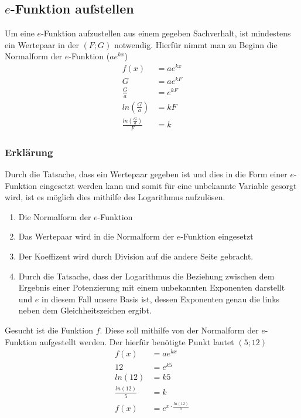 \subsection{$e$-Funktion aufstellen}
Um eine $e$-Funktion aufzustellen aus einem gegeben Sachverhalt, ist mindestens ein Wertepaar in der $(F;G)$ notwendig. Hierfür nimmt man zu Beginn die Normalform der $e$-Funktion ($ae^{kx}$)
\begin{align}
	f(x)&=ae^{kx}\\
	G&=ae^{kF}\\
	\frac{G}{a}&=e^{kF}\\
	ln\left(\frac{G}{a}\right)&=kF\\
	\frac{ln\left(\frac{G}{a}\right)}{F}&=k
\end{align}
\subsubsection{Erklärung}
Durch die Tatsache, dass ein Wertepaar gegeben ist und dies in die Form einer $e$-Funktion eingesetzt werden kann und somit für eine unbekannte Variable gesorgt wird, ist es möglich dies mithilfe des Logarithmus aufzulösen.
\begin{enumerate}
	\item Die Normalform der $e$-Funktion
	\item Das Wertepaar wird in die Normalform der $e$-Funktion eingesetzt
	\item Der Koeffizent wird durch Division auf die andere Seite gebracht. 
	\item Durch die Tatsache, dass der Logarithmus die Beziehung zwischen dem Ergebnis einer Potenzierung mit einem unbekannten Exponenten darstellt und $e$ in diesem Fall unsere Basis ist, dessen Exponenten genau die links neben dem Gleichheitszeichen ergibt. 
\end{enumerate}

\begin{beispiel}
	Gesucht ist die Funktion $f$. Diese soll mithilfe von der Normalform der $e$-Funktion aufgestellt werden. Der hierfür benötigte Punkt lautet $(5;12)$
	\begin{align*}
		f(x)&=ae^{kx}\\
		12&=e^{k5}\tag{Anwenden des ln}\\
		ln(12)&=k5\tag{Dividieren mit 5}\\
		\frac{ln(12)}{5}&=k\\
		f(x)&=e^{x\cdot \frac{ln(12)}{5}}
	\end{align*}
\end{beispiel}
